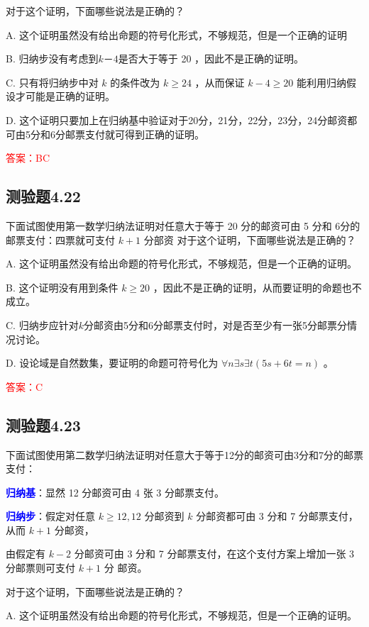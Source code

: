 \documentclass[UTF8, heading=true]{ctexart}
\begin{document}
对于这个证明，下面哪些说法是正确的？

A. 这个证明虽然没有给出命题的符号化形式，不够规范，但是一个正确的证明

B. 归纳步没有考虑到$k－4$是否大于等于 20 ，因此不是正确的证明。

C. 只有将归纳步中对 $k$ 的条件改为 $k \geq 24$ ，从而保证 $k-4 \geq 20$ 能利用归纳假设才可能是正确的证明。

D. 这个证明只要加上在归纳基中验证对于20分，21分，22分，23分，24分邮资都可由5分和6分邮票支付就可得到正确的证明。


\textcolor{red}{答案：BC}

\subsection{测验题4.22}

下面试图使用第一数学归纳法证明对任意大于等于 20 分的邮资可由 5 分和 6分的邮票支付：四票就可支付 $k+1$ 分部资
对于这个证明，下面哪些说法是正确的？

A. 这个证明虽然没有给出命题的符号化形式，不够规范，但是一个正确的证明。

B. 这个证明没有用到条件 $k \geq 20$ ，因此不是正确的证明，从而要证明的命题也不成立。

C. 归纳步应针对$k$分邮资由5分和6分邮票支付时，对是否至少有一张5分邮票分情况讨论。

D. 设论域是自然数集，要证明的命题可符号化为 $\forall n \exists s \exists t(5 s+6 t=n)$ 。

\textcolor{red}{答案：C}

\subsection{测验题4.23}

下面试图使用第二数学归纳法证明对任意大于等于12分的邮资可由3分和7分的邮票支付：

\textcolor{blue}{\textbf{归纳基}}：显然 12 分邮资可由 4 张 3 分邮票支付。

\textcolor{blue}{\textbf{归纳步}}：假定对任意 $k \geq 12,12$ 分邮资到 $k$ 分邮资都可由 3 分和 7 分邮票支付，从而 $k+1$ 分邮资，

由假定有 $k-2$ 分邮资可由 3 分和 7 分邮票支付，在这个支付方案上增加一张 3 分邮票则可支付 $k+1$ 分
邮资。

对于这个证明，下面哪些说法是正确的？

A. 
这个证明虽然没有给出命题的符号化形式，不够规范，但是一个正确的证明。
\end{document}
